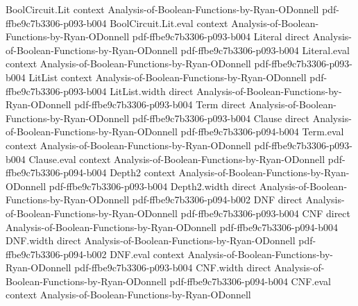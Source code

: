 \begin{lemma}
\leanok
{}
\proofstep
  {BoolCircuit.Lit}
  {context}
  {Analysis-of-Boolean-Functions-by-Ryan-ODonnell}
  {pdf-ffbe9c7b3306-p093-b004}
\proofstep
  {BoolCircuit.Lit.eval}
  {context}
  {Analysis-of-Boolean-Functions-by-Ryan-ODonnell}
  {pdf-ffbe9c7b3306-p093-b004}
\proofstep
  {Literal}
  {direct}
  {Analysis-of-Boolean-Functions-by-Ryan-ODonnell}
  {pdf-ffbe9c7b3306-p093-b004}
\proofstep
  {Literal.eval}
  {context}
  {Analysis-of-Boolean-Functions-by-Ryan-ODonnell}
  {pdf-ffbe9c7b3306-p093-b004}
\proofstep
  {LitList}
  {context}
  {Analysis-of-Boolean-Functions-by-Ryan-ODonnell}
  {pdf-ffbe9c7b3306-p093-b004}
\proofstep
  {LitList.width}
  {direct}
  {Analysis-of-Boolean-Functions-by-Ryan-ODonnell}
  {pdf-ffbe9c7b3306-p093-b004}
\proofstep
  {Term}
  {direct}
  {Analysis-of-Boolean-Functions-by-Ryan-ODonnell}
  {pdf-ffbe9c7b3306-p093-b004}
\proofstep
  {Clause}
  {direct}
  {Analysis-of-Boolean-Functions-by-Ryan-ODonnell}
  {pdf-ffbe9c7b3306-p094-b004}
\proofstep
  {Term.eval}
  {context}
  {Analysis-of-Boolean-Functions-by-Ryan-ODonnell}
  {pdf-ffbe9c7b3306-p093-b004}
\proofstep
  {Clause.eval}
  {context}
  {Analysis-of-Boolean-Functions-by-Ryan-ODonnell}
  {pdf-ffbe9c7b3306-p094-b004}
\proofstep
  {Depth2}
  {context}
  {Analysis-of-Boolean-Functions-by-Ryan-ODonnell}
  {pdf-ffbe9c7b3306-p093-b004}
\proofstep
  {Depth2.width}
  {direct}
  {Analysis-of-Boolean-Functions-by-Ryan-ODonnell}
  {pdf-ffbe9c7b3306-p094-b002}
\proofstep
  {DNF}
  {direct}
  {Analysis-of-Boolean-Functions-by-Ryan-ODonnell}
  {pdf-ffbe9c7b3306-p093-b004}
\proofstep
  {CNF}
  {direct}
  {Analysis-of-Boolean-Functions-by-Ryan-ODonnell}
  {pdf-ffbe9c7b3306-p094-b004}
\proofstep
  {DNF.width}
  {direct}
  {Analysis-of-Boolean-Functions-by-Ryan-ODonnell}
  {pdf-ffbe9c7b3306-p094-b002}
\proofstep
  {DNF.eval}
  {context}
  {Analysis-of-Boolean-Functions-by-Ryan-ODonnell}
  {pdf-ffbe9c7b3306-p093-b004}
\proofstep
  {CNF.width}
  {direct}
  {Analysis-of-Boolean-Functions-by-Ryan-ODonnell}
  {pdf-ffbe9c7b3306-p094-b004}
\proofstep
  {CNF.eval}
  {context}
  {Analysis-of-Boolean-Functions-by-Ryan-ODonnell}

\end{lemma}
